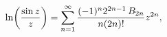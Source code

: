 \[\mathop{\ln\/}\nolimits\!\left(\frac{\mathop{\sin\/}\nolimits z}{z}\right)=%
\sum_{n=1}^{\infty}\frac{(-1)^{n}2^{2n-1}\mathop{B_{2n}\/}\nolimits}{n(2n)!}z^%
{2n},\]